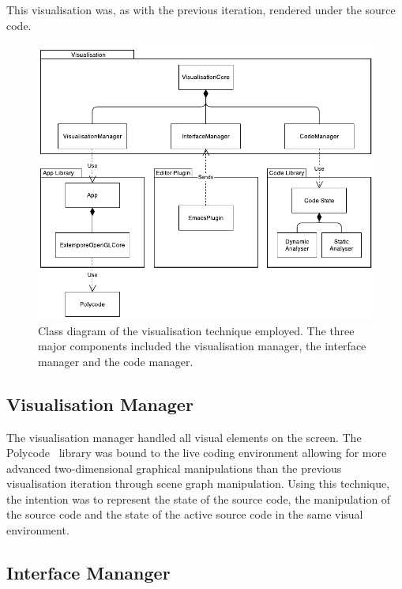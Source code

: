 This visualisation was, as with the previous iteration, rendered under the source code. 


\begin{figure}
  \centering \includegraphics[width=\columnwidth]{../images/diagrams/visualisation-class-diagram.pdf}
  \caption[Prototype (second iteration) class diagram]{Class diagram of the visualisation technique employed. The three major components included the visualisation manager, the interface manager and the code manager.}
\label{fig:visualisation-class-diagram}
\end{figure}

\subsection{Visualisation Manager}

The visualisation manager handled all visual elements on the screen. The Polycode~\cite{Safrin2013} library was bound to the live coding environment allowing for more advanced two-dimensional graphical manipulations than the previous visualisation iteration through scene graph manipulation. Using this technique, the intention was to represent the state of the source code, the manipulation of the source code and the state of the active source code in the same visual environment.

\subsection{Interface Mananger}
\label{sec:interface-manager}

